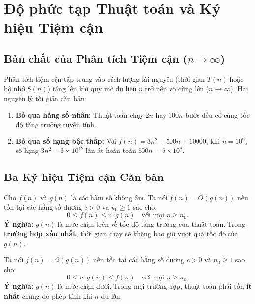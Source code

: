 \documentclass[11pt,a4paper]{article}
\begin{document}
\newpage
\section{Độ phức tạp Thuật toán và Ký hiệu Tiệm cận}

\subsection{Bản chất của Phân tích Tiệm cận ($n \to \infty$)}
Phân tích tiệm cận tập trung vào cách lượng tài nguyên (thời gian $T(n)$ hoặc bộ nhớ $S(n)$) tăng lên khi quy mô dữ liệu $n$ trở nên vô cùng lớn ($n \to \infty$). Hai nguyên lý tối giản căn bản:
\begin{enumerate}[itemsep=1pt]
    \item \textbf{Bỏ qua hằng số nhân:} Thuật toán chạy $2n$ hay $100n$ bước đều có cùng tốc độ tăng trưởng tuyến tính.
    \item \textbf{Bỏ qua số hạng bậc thấp:} Với $f(n) = 3n^2 + 500n + 10000$, khi $n = 10^6$, số hạng $3n^2 = 3 \times 10^{12}$ lấn át hoàn toàn $500n = 5 \times 10^8$.
\end{enumerate}

\subsection{Ba Ký hiệu Tiệm cận Căn bản}

\begin{definitionbox}
Cho $f(n)$ và $g(n)$ là các hàm số không âm. Ta nói $f(n) = O(g(n))$ nếu tồn tại các hằng số dương $c > 0$ và $n_0 \ge 1$ sao cho:
\[
0 \le f(n) \le c \cdot g(n) \quad \text{với mọi } n \ge n_0.
\]
\textbf{Ý nghĩa:} $g(n)$ là mức chặn trên về tốc độ tăng trưởng của thuật toán. Trong \textbf{trường hợp xấu nhất}, thời gian chạy sẽ không bao giờ vượt quá tốc độ của $g(n)$.
\end{definitionbox}

\begin{definitionbox}
Ta nói $f(n) = \Omega(g(n))$ nếu tồn tại các hằng số dương $c > 0$ và $n_0 \ge 1$ sao cho:
\[
0 \le c \cdot g(n) \le f(n) \quad \text{với mọi } n \ge n_0.
\]
\textbf{Ý nghĩa:} $g(n)$ là mức chặn dưới. Trong mọi trường hợp, thuật toán phải tốn \textbf{ít nhất} chừng đó phép tính khi $n$ đủ lớn.
\end{definitionbox}
\end{document}
